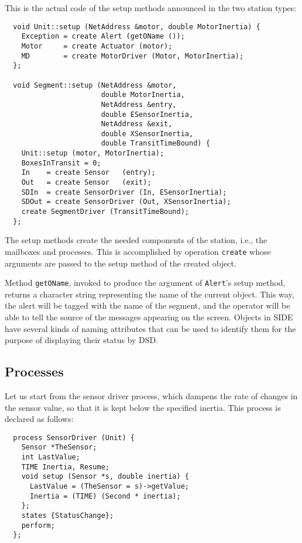 This is the actual code of the setup methods announced in the two station
types:

{\small\begin{verbatim}
  void Unit::setup (NetAddress &motor, double MotorInertia) {
    Exception = create Alert (getOName ());
    Motor     = create Actuator (motor);
    MD        = create MotorDriver (Motor, MotorInertia);
  };
  
  void Segment::setup (NetAddress &motor,
                       double MotorInertia,
                       NetAddress &entry,
                       double ESensorInertia,
                       NetAddress &exit,
                       double XSensorInertia,
                       double TransitTimeBound) {
    Unit::setup (motor, MotorInertia);
    BoxesInTransit = 0;
    In    = create Sensor   (entry);
    Out   = create Sensor   (exit);
    SDIn  = create SensorDriver (In, ESensorInertia);
    SDOut = create SensorDriver (Out, XSensorInertia);
    create SegmentDriver (TransitTimeBound);
  };
\end{verbatim}}

The setup methods create the needed components of the station, i.e.,
the mailboxes and processes.
This is accomplished by operation {\tt create} whose arguments are passed
to the setup method of the created object.

Method {\tt getOName}, invoked to produce the argument of {\tt Alert}'s
setup method, returns a character string representing the name of the
current object.
This way, the alert will be tagged with the name of the segment, and the
operator will be able to tell the source of the messages appearing on the
screen.
Objects in SIDE have several kinds of
naming attributes that can be used to identify
them for the purpose of displaying their status by DSD.

\subsection{Processes}
\label{segdrv}

Let us start from the sensor driver process, which dampens the rate of
changes in the sensor value, so that it is kept below the specified
inertia.
This process is declared as follows:

{\small\begin{verbatim}
  process SensorDriver (Unit) {
    Sensor *TheSensor;
    int LastValue;
    TIME Inertia, Resume;
    void setup (Sensor *s, double inertia) {
      LastValue = (TheSensor = s)->getValue;
      Inertia = (TIME) (Second * inertia);
    };
    states {StatusChange};
    perform;
  };
\end{verbatim}}

